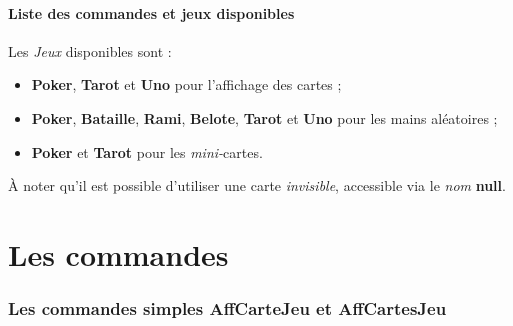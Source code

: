 \documentclass[a4paper]{article}
\newcommand\Cle[1]{{\bfseries\sffamily\textlangle #1\textrangle}}
\begin{document}
\subsection{Liste des commandes et jeux disponibles}

\begin{codeinfo}
Les \textit{Jeux} disponibles sont :

\begin{itemize}
	\item \Cle{Poker}, \Cle{Tarot} et \Cle{Uno} pour l'affichage des cartes ;
	\item \Cle{Poker}, \Cle{Bataille}, \Cle{Rami}, \Cle{Belote}, \Cle{Tarot}  et \Cle{Uno} pour les mains aléatoires ;
	\item \Cle{Poker} et \Cle{Tarot} pour les \textit{mini-}cartes.
\end{itemize}

À noter qu'il est possible d'utiliser une carte \textit{invisible}, accessible via le \textit{nom} \Cle{null}.
\end{codeinfo}

\begin{codetex}






\end{codetex}

\pagebreak

\part{Les commandes}

\section{Les commandes simples \og AffCarteJeu \fg{} et \og AffCartesJeu \fg}
\end{document}
